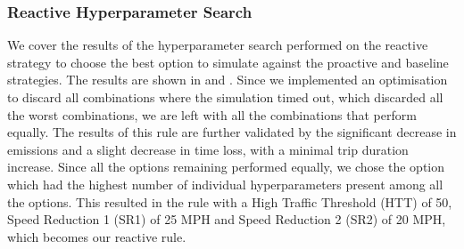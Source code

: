\subsubsection{Reactive Hyperparameter Search}
We cover the results of the hyperparameter search performed on the reactive strategy to choose the best option to simulate against the proactive and baseline strategies. The results are shown in  and . Since we implemented an optimisation to discard all combinations where the simulation timed out, which discarded all the worst combinations, we are left with all the combinations that perform equally. The results of this rule are further validated by the significant decrease in emissions and a slight decrease in time loss, with a minimal trip duration increase. Since all the options remaining performed equally, we chose the option which had the highest number of individual hyperparameters present among all the options. This resulted in the rule with a High Traffic Threshold (HTT) of 50, Speed Reduction 1 (SR1) of 25 MPH and Speed Reduction 2 (SR2) of 20 MPH, which becomes our reactive rule.

\begin{table}[!ht]
    \centering
    \caption{Reactive Hyperparameter Search Results and Metrics}
    \label{table:reactive-bench-results}
\end{table}

